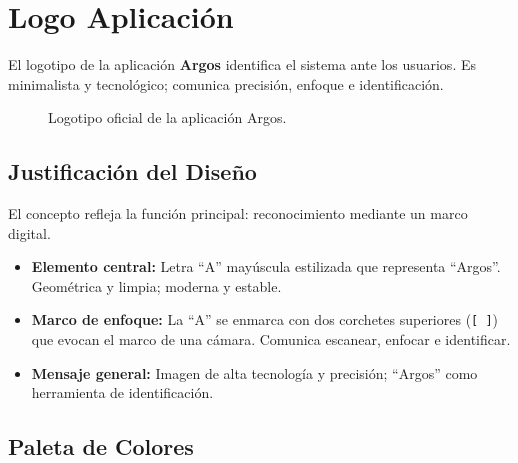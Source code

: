 
\section{Logo Aplicación}

El logotipo de la aplicación \textbf{Argos} identifica el sistema ante los usuarios. Es minimalista y tecnológico; comunica precisión, enfoque e identificación.

\begin{figure}[h!]
		\centering
		\caption{Logotipo oficial de la aplicación Argos.}\label{fig:logo_argos}
\end{figure}

\subsection*{Justificación del Diseño}

El concepto refleja la función principal: reconocimiento mediante un marco digital.

\begin{itemize}
		\item \textbf{Elemento central:} Letra “A” mayúscula estilizada que representa “Argos”. Geométrica y limpia; moderna y estable.
		\item \textbf{Marco de enfoque:} La “A” se enmarca con dos corchetes superiores (\texttt{[ ]}) que evocan el marco de una cámara. Comunica escanear, enfocar e identificar.
		\item \textbf{Mensaje general:} Imagen de alta tecnología y precisión; “Argos” como herramienta de identificación.
\end{itemize}

\subsection*{Paleta de Colores}

